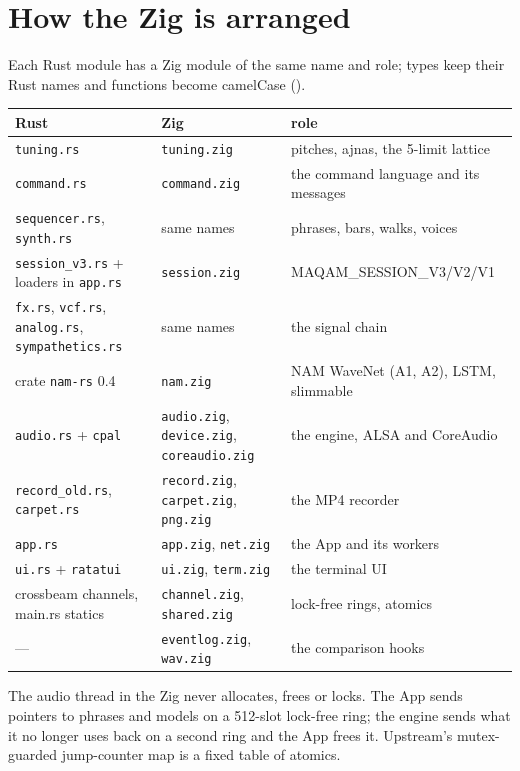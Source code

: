\section{How the Zig is arranged}
Each Rust module has a Zig module of the same name and role; types keep their
Rust names and functions become camelCase ().

\begin{longtable}{lll}
\toprule
Rust & Zig & role\\
\midrule
\endhead
\texttt{tuning.rs} & \texttt{tuning.zig} & pitches, ajnas, the 5-limit lattice\\
\texttt{command.rs} & \texttt{command.zig} & the command language and its messages\\
\texttt{sequencer.rs}, \texttt{synth.rs} & same names & phrases, bars, walks, voices\\
\texttt{session\_v3.rs} + loaders in \texttt{app.rs} & \texttt{session.zig} & MAQAM\_SESSION\_V3/V2/V1\\
\texttt{fx.rs}, \texttt{vcf.rs}, \texttt{analog.rs}, \texttt{sympathetics.rs} & same names & the signal chain\\
crate \texttt{nam-rs} 0.4 & \texttt{nam.zig} & NAM WaveNet (A1, A2), LSTM, slimmable\\
\texttt{audio.rs} + \texttt{cpal} & \texttt{audio.zig}, \texttt{device.zig}, \texttt{coreaudio.zig} & the engine, ALSA and CoreAudio\\
\texttt{record\_old.rs}, \texttt{carpet.rs} & \texttt{record.zig}, \texttt{carpet.zig}, \texttt{png.zig} & the MP4 recorder\\
\texttt{app.rs} & \texttt{app.zig}, \texttt{net.zig} & the App and its workers\\
\texttt{ui.rs} + \texttt{ratatui} & \texttt{ui.zig}, \texttt{term.zig} & the terminal UI\\
crossbeam channels, main.rs statics & \texttt{channel.zig}, \texttt{shared.zig} & lock-free rings, atomics\\
--- & \texttt{eventlog.zig}, \texttt{wav.zig} & the comparison hooks\\
\bottomrule
\end{longtable}

The audio thread in the Zig never allocates, frees or locks. The App sends
pointers to phrases and models on a 512-slot lock-free ring; the engine sends
what it no longer uses back on a second ring and the App frees it. Upstream's
mutex-guarded jump-counter map is a fixed table of atomics.

